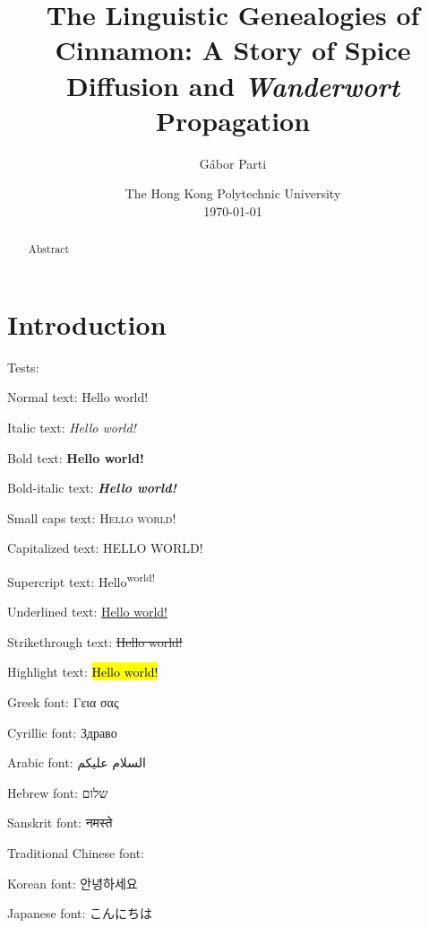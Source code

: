 \documentclass[12pt]{article}
\title{The Linguistic Genealogies of Cinnamon: A Story of Spice Diffusion and \textit{Wanderwort} Propagation}
\author{Gábor Parti {\small\orcid{0000-0003-2042-4655}}}
\date{The Hong Kong Polytechnic University\\[2.5ex]\today}
\newcommand{\tc}[1]{\traditionalchinesefont{#1}\rmfamily}
\begin{document}
\setlength{\tabcolsep}{2pt} %

\maketitle

\begin{abstract}
    Abstract
\end{abstract}


\section{Introduction}

Tests:

Normal text: Hello world!

Italic text: \textit{Hello world!}

Bold text: \textbf{Hello world!}

Bold-italic text: \textbf{\textit{Hello world!}}

Small caps text: \textsc{Hello world!}

Capitalized text: \MakeUppercase{Hello world!}

Supercript text: Hello\textsuperscript{world!}

Underlined text: \ul{Hello world!}

Strikethrough text: \st{Hello world!}

Highlight text: \hl{Hello world!}



Greek font: Γεια σας

Cyrillic font: Здраво

Arabic font: السلام عليكم

Hebrew font: שלום

Sanskrit font: नमस्ते

Traditional Chinese font: \tc{你好}

Korean font: 안녕하세요

Japanese font: こんにちは






\end{document}
